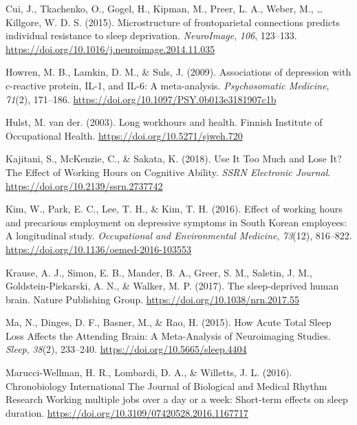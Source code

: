 \documentclass[
  english,
  man]{apa6}
\newlength{\cslhangindent}
\newenvironment{cslreferences}%
  {\setlength{\parindent}{0pt}%
  \everypar{\setlength{\hangindent}{\cslhangindent}}\ignorespaces}%
  {\par}
\begin{document}
\begin{cslreferences}
\leavevmode\hypertarget{ref-Cui2015}{}%
Cui, J., Tkachenko, O., Gogel, H., Kipman, M., Preer, L. A., Weber, M., \ldots{} Killgore, W. D. S. (2015). Microstructure of frontoparietal connections predicts individual resistance to sleep deprivation. \emph{NeuroImage}, \emph{106}, 123--133. \url{https://doi.org/10.1016/j.neuroimage.2014.11.035}

\leavevmode\hypertarget{ref-Howren2009}{}%
Howren, M. B., Lamkin, D. M., \& Suls, J. (2009). Associations of depression with c-reactive protein, IL-1, and IL-6: A meta-analysis. \emph{Psychosomatic Medicine}, \emph{71}(2), 171--186. \url{https://doi.org/10.1097/PSY.0b013e3181907c1b}

\leavevmode\hypertarget{ref-VanderHulst2003}{}%
Hulst, M. van der. (2003). Long workhours and health. Finnish Institute of Occupational Health. \url{https://doi.org/10.5271/sjweh.720}

\leavevmode\hypertarget{ref-Kajitani2018}{}%
Kajitani, S., McKenzie, C., \& Sakata, K. (2018). Use It Too Much and Lose It? The Effect of Working Hours on Cognitive Ability. \emph{SSRN Electronic Journal}. \url{https://doi.org/10.2139/ssrn.2737742}

\leavevmode\hypertarget{ref-Kim2016}{}%
Kim, W., Park, E. C., Lee, T. H., \& Kim, T. H. (2016). Effect of working hours and precarious employment on depressive symptoms in South Korean employees: A longitudinal study. \emph{Occupational and Environmental Medicine}, \emph{73}(12), 816--822. \url{https://doi.org/10.1136/oemed-2016-103553}

\leavevmode\hypertarget{ref-Krause2017}{}%
Krause, A. J., Simon, E. B., Mander, B. A., Greer, S. M., Saletin, J. M., Goldstein-Piekarski, A. N., \& Walker, M. P. (2017). The sleep-deprived human brain. Nature Publishing Group. \url{https://doi.org/10.1038/nrn.2017.55}

\leavevmode\hypertarget{ref-Ma2015}{}%
Ma, N., Dinges, D. F., Basner, M., \& Rao, H. (2015). How Acute Total Sleep Loss Affects the Attending Brain: A Meta-Analysis of Neuroimaging Studies. \emph{Sleep}, \emph{38}(2), 233--240. \url{https://doi.org/10.5665/sleep.4404}

\leavevmode\hypertarget{ref-Marucci-Wellman2016}{}%
Marucci-Wellman, H. R., Lombardi, D. A., \& Willetts, J. L. (2016). Chronobiology International The Journal of Biological and Medical Rhythm Research Working multiple jobs over a day or a week: Short-term effects on sleep duration. \url{https://doi.org/10.3109/07420528.2016.1167717}


\end{cslreferences}
\end{document}
